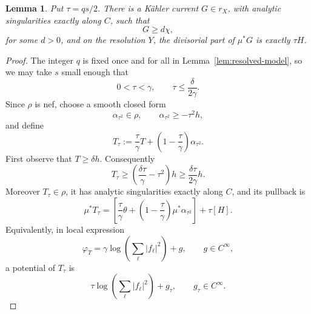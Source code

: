 \documentclass[reqno]{amsart}
\theoremstyle{remark}
\theoremstyle{plain}
\newtheorem{lemma}[thm]{Lemma}
\begin{document}
\begin{lemma}\label{lem:smaller-model}
Put $\tau=qs/2$.  There is a K\"ahler current $G\in r_X$, with
analytic singularities exactly along $C$, such that
\[
 G\geq d\chi,
\] for some $d>0$, and on the resolution $Y$, the divisorial part
of $\mu^*G$ is exactly $\tau H$.
\end{lemma}
\begin{proof}

The integer $q$ is fixed once and for all in
Lemma~\ref{lem:resolved-model}, so we may take $s$ small enough that
\[
 0<\tau<\gamma,
 \qquad
 \tau\leq\frac{\delta}{2\gamma}.
\]
Since $\rho$ is nef, choose a smooth closed form
\[
 \alpha_{\tau^2}\in\rho,
 \qquad
 \alpha_{\tau^2}\geq-\tau^2h,
\]
and define
\begin{equation}\label{eq:scaled-fixed-current}
 T_\tau
 :=
 \frac{\tau}{\gamma}T+
 \left(1-\frac{\tau}{\gamma}\right)\alpha_{\tau^2}.
\end{equation}
First observe that $T\geq\delta h$.  %
Consequently
\begin{equation}\label{eq:scaled-current-lower-bound}
 T_\tau
 \geq
 \left(\frac{\delta\tau}{\gamma}-\tau^2\right)h
 \geq\frac{\delta\tau}{2\gamma}h.
\end{equation}
Moreover $T_\tau\in\rho$, it has analytic singularities exactly
along $C$, and its pullback is
\begin{equation}\label{eq:scaled-current-pullback}
 \mu^*T_\tau
 =
 \left[
  \frac{\tau}{\gamma}\theta+
  \left(1-\frac{\tau}{\gamma}\right)\mu^*\alpha_{\tau^2}
 \right]
 +\tau[H].
\end{equation}
Equivalently, in local expression
\[
 \varphi_T
 =\gamma\log\!\left(\sum_\ell|f_\ell|^2\right)+g,
 \qquad g\in C^\infty,
\]
a potential of $T_\tau$ is
\[
 \tau\log\!\left(\sum_\ell|f_\ell|^2\right)+g_\tau,
 \qquad g_\tau\in C^\infty.
\]



\end{proof}
\end{document}
